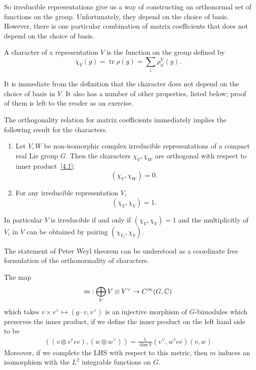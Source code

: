 \documentclass[12pt]{article}
\begin{document}
So irreducible representations give us a way of constructing an orthonormal
set of functions on the group. Unfortunately, they depend on the choice of
basis. However, there is one particular combination of matrix coefficients
that does not depend on the choice of basis.

\begin{definition}
    A character of a representation $V$ is the function on the group defined by
    \[
        \chi_V(g)=\operatorname{tr}\rho(g)=\sum_i \rho^V_{ii}(g).
    \]
\end{definition}

It is immediate from the definition that the character does not depend on the
choice of basis in $V$. It also has a number of other properties, listed
below; proof of them is left to the reader as an exercise.

The orthogonality relation for matrix coefficients immediately implies the
following result for the characters.

\begin{theorem}\leavevmode
    \begin{enumerate}
        \item Let $V,W$ be non-isomorphic complex irreducible representations of a
              compact real Lie group $G$. Then the characters $\chi_V,\chi_W$ are orthogonal
              with respect to inner product~\eqref{4.1}:
              \[
                  (\chi_V,\chi_W)=0.
              \]

        \item For any irreducible representation $V$,
              \[
                  (\chi_V,\chi_V)=1.
              \]
    \end{enumerate}
\end{theorem}
In particular $V$ is irreducible if and only if $(\chi_V,\chi_V) = 1$ and the multiplicitly of $V_i$ in $V$ can be obtained by pairing $(\chi_{V_i},\chi_V)$.

The statement of Peter Weyl theorem can be understood as a coordinate free formulation of the orthonormality of characters.

\begin{theorem}
    The map \begin{align*}
        m: \bigoplus_{V} V \otimes V^\vee \to C^\infty(G,\mathbb{C})
    \end{align*} which takes $v\times v^\vee \mapsto (g\cdot v,v^\vee)$ is an injective morphism of $G$-bimodules which preserves the inner product, if we define the inner product on the left hand side to be \begin{align*}
        ((v\otimes v^vee ), (w\otimes w^\vee)) = \frac{1}{\dim V} (v^\vee, w^vee)(v,w)
    \end{align*}
    Moreover, if we complete the LHS with respect to this metric, then $m$ induces an isomorphism with the $L^2$ integrable functions on $G$.
\end{theorem}
\end{document}
